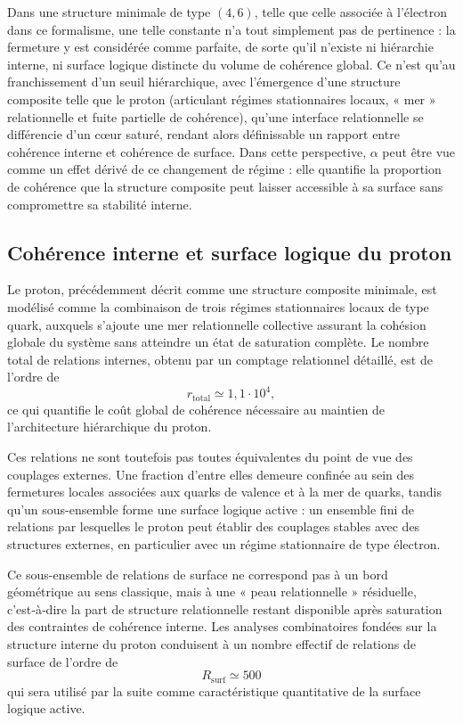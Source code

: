\documentclass[11pt,a4paper]{article}
\begin{document}
Dans une structure minimale de type \(\left(4,6\right)\), telle que celle associée à l’électron dans ce formalisme, une telle constante n’a tout simplement pas de pertinence : la fermeture y est considérée comme parfaite, de sorte qu’il n’existe ni hiérarchie interne, ni surface logique distincte du volume de cohérence global. Ce n’est qu’au franchissement d’un seuil hiérarchique, avec l’émergence d’une structure composite telle que le proton (articulant régimes stationnaires locaux, « mer » relationnelle et fuite partielle de cohérence), qu’une interface relationnelle se différencie d’un cœur saturé, rendant alors définissable un rapport entre cohérence interne et cohérence de surface. Dans cette perspective, \(\alpha\) peut être vue comme un effet dérivé de ce changement de régime : elle quantifie la proportion de cohérence que la structure composite peut laisser accessible à sa surface sans compromettre sa stabilité interne.

\subsection{Cohérence interne et surface logique du proton}

Le proton, précédemment décrit comme une structure composite minimale, est modélisé comme la combinaison de trois régimes stationnaires locaux de type quark, auxquels s’ajoute une mer relationnelle collective assurant la cohésion globale du système sans atteindre un état de saturation complète. Le nombre total de relations internes, obtenu par un comptage relationnel détaillé, est de l’ordre de
\[
r_{\mathrm{total}} \simeq 1{,}1\cdot 10^{4},
\]
ce qui quantifie le coût global de cohérence nécessaire au maintien de l’architecture hiérarchique du proton.

Ces relations ne sont toutefois pas toutes équivalentes du point de vue des couplages externes. Une fraction d’entre elles demeure confinée au sein des fermetures locales associées aux quarks de valence et à la mer de quarks, tandis qu’un sous-ensemble forme une surface logique active : un ensemble fini de relations par lesquelles le proton peut établir des couplages stables avec des structures externes, en particulier avec un régime stationnaire de type électron.

Ce sous-ensemble de relations de surface ne correspond pas à un bord géométrique au sens classique, mais à une « peau relationnelle » résiduelle, c’est‑à‑dire la part de structure relationnelle restant disponible après saturation des contraintes de cohérence interne. Les analyses combinatoires fondées sur la structure interne du proton conduisent à un nombre effectif de relations de surface de l’ordre de
\[
R_{\mathrm{surf}} \simeq 500
\]
qui sera utilisé par la suite comme caractéristique quantitative de la surface logique active.
\end{document}
